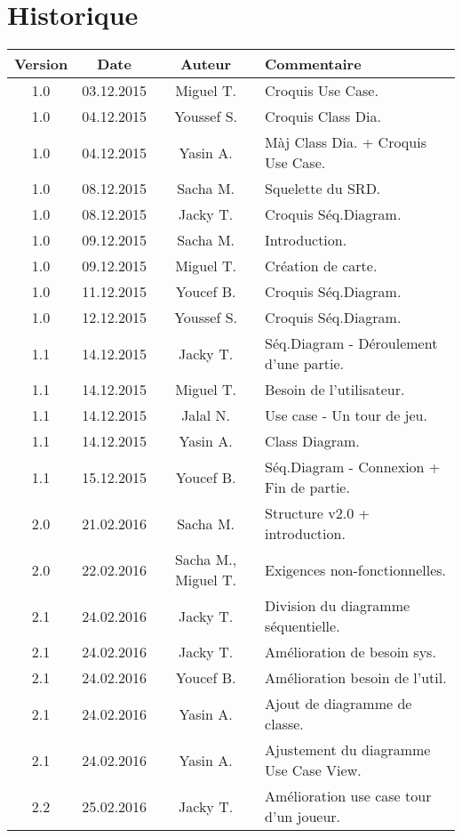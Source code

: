 \section{Historique}
\begin{adjustbox}{max width=\paperwidth}
\begin{tabular}{|c|c|c|m{7cm}|}
\hline \textbf{Version} &  \textbf{Date} & \textbf{Auteur} & \textbf{Commentaire} \\
\hline
1.0 & 03.12.2015 & Miguel T. & Croquis Use Case.\\
1.0 & 04.12.2015 & Youssef S. & Croquis Class Dia.\\
1.0 & 04.12.2015 & Yasin A. & Màj Class Dia. + Croquis Use Case.\\
1.0 & 08.12.2015 & Sacha M. & Squelette du SRD.\\
1.0 & 08.12.2015 & Jacky T. & Croquis Séq.Diagram.\\
1.0 & 09.12.2015 & Sacha M. & Introduction.\\
1.0 & 09.12.2015 & Miguel T. & Création de carte.\\
1.0 & 11.12.2015 & Youcef B. & Croquis Séq.Diagram.\\
1.0 & 12.12.2015 & Youssef S. & Croquis Séq.Diagram.\\
\hline
1.1 & 14.12.2015 & Jacky T. & Séq.Diagram - Déroulement d'une partie.\\
1.1 & 14.12.2015 & Miguel T. & Besoin de l'utilisateur.\\
1.1 & 14.12.2015 & Jalal N. & Use case - Un tour de jeu.\\
1.1 & 14.12.2015 & Yasin A. & Class Diagram.\\
1.1 & 15.12.2015 & Youcef B. & Séq.Diagram - Connexion + Fin de partie.\\
\hline
2.0 & 21.02.2016 & Sacha M. & Structure v2.0 + introduction.\\
2.0 & 22.02.2016 & Sacha M., Miguel T. & Exigences non-fonctionnelles.\\
\hline
2.1 & 24.02.2016 & Jacky T. & Division du diagramme séquentielle.\\
2.1 & 24.02.2016 & Jacky T. & Amélioration de besoin sys.\\
2.1 & 24.02.2016 & Youcef B. & Amélioration besoin de l'util.\\
2.1 & 24.02.2016 & Yasin A. & Ajout de diagramme de classe.\\
2.1 & 24.02.2016 & Yasin A. & Ajustement du diagramme Use Case View.\\
\hline 
2.2 & 25.02.2016 & Jacky T. & Amélioration use case tour d'un joueur.\\

\end{tabular}
\end{adjustbox}
